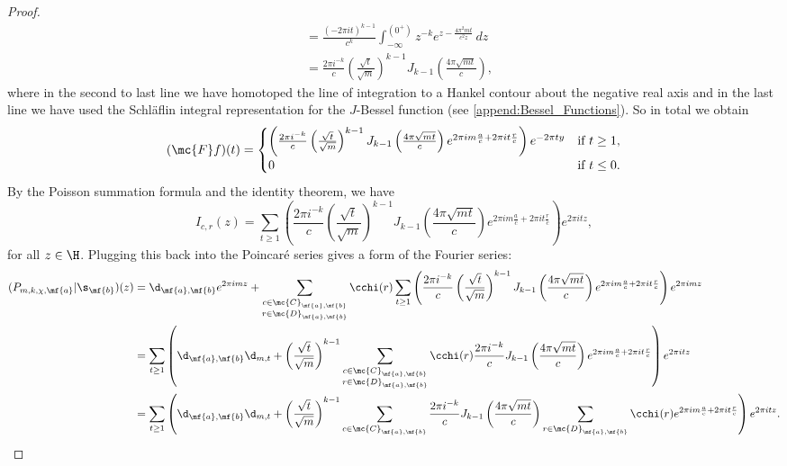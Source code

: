 \begin{proof}
\begin{align*}
        &= \frac{(-2\pi it)^{k-1}}{c^{k}}\int_{-\infty}^{(0^{+})}z^{-k}e^{z-\frac{4\pi^{2}mt}{c^{2}z}}\,dz \\
        &= \frac{2\pi i^{-k}}{c}\left(\frac{\sqrt{t}}{\sqrt{m}}\right)^{k-1}J_{k-1}\left(\frac{4\pi\sqrt{mt}}{c}\right),
      \end{align*}
      where in the second to last line we have homotoped the line of integration to a Hankel contour about the negative real axis and in the last line we have used the Schl\"aflin integral representation for the $J$-Bessel function (see \cref{append:Bessel_Functions}). So in total we obtain
      \[
        (\mc{F}f)(t) = \begin{cases} \left(\frac{2\pi i^{-k}}{c}\left(\frac{\sqrt{t}}{\sqrt{m}}\right)^{k-1}J_{k-1}\left(\frac{4\pi\sqrt{mt}}{c}\right)e^{2\pi im\frac{a}{c}+2\pi it\frac{r}{c}}\right)e^{-2\pi ty} & \text{if $t \ge 1$}, \\ 0 & \text{if $t \le 0$}. \end{cases}
      \]
      By the Poisson summation formula and the identity theorem, we have
      \[
        I_{c,r}(z) = \sum_{t \ge 1}\left(\frac{2\pi i^{-k}}{c}\left(\frac{\sqrt{t}}{\sqrt{m}}\right)^{k-1}J_{k-1}\left(\frac{4\pi\sqrt{mt}}{c}\right)e^{2\pi im\frac{a}{c}+2\pi it\frac{r}{c}}\right)e^{2\pi itz},
      \]
      for all $z \in \H$. Plugging this back into the Poincar\'e series gives a form of the Fourier series:
      \begin{align*}
        (P_{m,k,\chi,\mf{a}}|\s_{\mf{b}})(z) &= \d_{\mf{a},\mf{b}}e^{2\pi imz}+\sum_{\substack{c \in \mc{C}_{\mf{a},\mf{b}} \\ r \in \mc{D}_{\mf{a},\mf{b}}}}\cchi(r)\sum_{t \ge 1}\left(\frac{2\pi i^{-k}}{c}\left(\frac{\sqrt{t}}{\sqrt{m}}\right)^{k-1}J_{k-1}\left(\frac{4\pi\sqrt{mt}}{c}\right)e^{2\pi im\frac{a}{c}+2\pi it\frac{r}{c}}\right)e^{2\pi imz} \\
        &= \sum_{t \ge 1}\left(\d_{\mf{a},\mf{b}}\d_{m,t}+\left(\frac{\sqrt{t}}{\sqrt{m}}\right)^{k-1}\sum_{\substack{c \in \mc{C}_{\mf{a},\mf{b}} \\ r \in \mc{D}_{\mf{a},\mf{b}}}}\cchi(r)\frac{2\pi i^{-k}}{c}J_{k-1}\left(\frac{4\pi\sqrt{mt}}{c}\right)e^{2\pi im\frac{a}{c}+2\pi it\frac{r}{c}}\right)e^{2\pi itz} \\
        &= \sum_{t \ge 1}\left(\d_{\mf{a},\mf{b}}\d_{m,t}+\left(\frac{\sqrt{t}}{\sqrt{m}}\right)^{k-1}\sum_{\substack{c \in \mc{C}_{\mf{a},\mf{b}}}}\frac{2\pi i^{-k}}{c}J_{k-1}\left(\frac{4\pi\sqrt{mt}}{c}\right)\sum_{r \in \mc{D}_{\mf{a},\mf{b}}}\cchi(r)e^{2\pi im\frac{a}{c}+2\pi it\frac{r}{c}}\right)e^{2\pi itz}.

\end{align*}
\end{proof}
